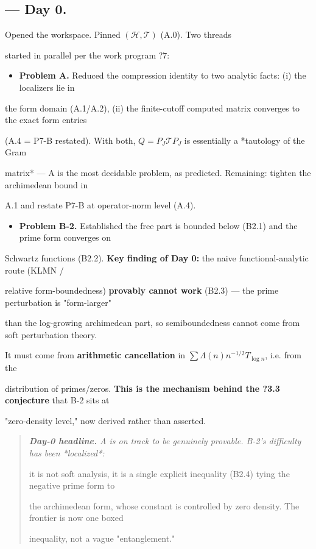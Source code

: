 \documentclass[10pt]{article}
\begin{document}
\subsection*{ --- Day 0.}
Opened the workspace. Pinned $(\mathcal H,\mathcal T)$ (A.0). Two threads\par
started in parallel per the work program ?7:\par
\begin{itemize}
\item \textbf{Problem A.} Reduced the compression identity to two analytic facts: (i) the localizers lie in
\end{itemize}
  the form domain (A.1/A.2), (ii) the finite-cutoff computed matrix converges to the exact form entries\par
  (A.4 = P7-B restated). With both, $Q=P_J\mathcal T P_J$ is essentially a *tautology of the Gram\par
  matrix* --- A is the most decidable problem, as predicted. Remaining: tighten the archimedean bound in\par
  A.1 and restate P7-B at operator-norm level (A.4).\par
\begin{itemize}
\item \textbf{Problem B-2.} Established the free part is bounded below (B2.1) and the prime form converges on
\end{itemize}
  Schwartz functions (B2.2). \textbf{Key finding of Day 0:} the naive functional-analytic route (KLMN /\par
  relative form-boundedness) \textbf{provably cannot work} (B2.3) --- the prime perturbation is "form-larger"\par
  than the log-growing archimedean part, so semiboundedness cannot come from soft perturbation theory.\par
  It must come from \textbf{arithmetic cancellation} in $\sum\Lambda(n)n^{-1/2}T_{\log n}$, i.e. from the\par
  distribution of primes/zeros. \textbf{This is the mechanism behind the ?3.3 conjecture} that B-2 sits at\par
  "zero-density level," now derived rather than asserted.\par

\begin{quote}\itshape
\textbf{Day-0 headline.} A is on track to be genuinely provable. B-2's difficulty has been *localized*:\par
it is not soft analysis, it is a single explicit inequality (B2.4) tying the negative prime form to\par
the archimedean form, whose constant is controlled by zero density. The frontier is now one boxed\par
inequality, not a vague "entanglement."\par
\end{quote}
\end{document}

